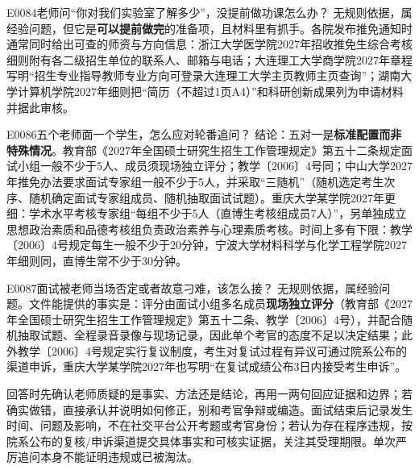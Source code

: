 \begin{qa}{E0084}{老师问“你对我们实验室了解多少”，没提前做功课怎么办？}
无规则依据，属经验问题，但它是\textbf{可以提前做完}的准备项，且材料里有抓手。各院发布推免通知时通常同时给出可查的师资与方向信息：浙江大学医学院2027年招收推免生综合考核细则附有各二级招生单位的联系人、邮箱与电话；大连理工大学商学院2027年章程写明“招生专业指导教师专业方向可登录大连理工大学主页教师主页查询”；湖南大学计算机学院2027年细则把“简历（不超过1页A4）”和科研创新成果列为申请材料并据此审核。
\end{qa}

\begin{qa}{E0086}{五个老师面一个学生，怎么应对轮番追问？}
结论：五对一是\textbf{标准配置而非特殊情况}。教育部《2027年全国硕士研究生招生工作管理规定》第五十二条规定面试小组一般不少于5人、成员须现场独立评分；教学〔2006〕4号同；中山大学2027年推免办法要求面试专家组一般不少于5人，并采取“三随机”（随机选定考生次序、随机确定面试专家组成员、随机抽取面试试题）。重庆大学某学院2027年更细：学术水平考核专家组“每组不少于5人（直博生考核组成员7人）”，另单独成立思想政治素质和品德考核组负责政治素养与心理素质考核。时间上多有下限：教学〔2006〕4号规定每生一般不少于20分钟，宁波大学材料科学与化学工程学院2027年细则同，直博生常不少于30分钟。
\end{qa}

\begin{qa}{E0087}{面试被老师当场否定或者故意刁难，该怎么接？}
无规则依据，属经验问题。文件能提供的事实是：评分由面试小组多名成员\textbf{现场独立评分}（教育部《2027年全国硕士研究生招生工作管理规定》第五十二条、教学〔2006〕4号），并配合随机抽取试题、全程录音录像与现场记录，因此单个考官的态度不足以决定结果；此外教学〔2006〕4号规定实行复议制度，考生对复试过程有异议可通过院系公布的渠道申诉，重庆大学某学院2027年也写明“在复试成绩公布3日内接受考生申诉”。

回答时先确认老师质疑的是事实、方法还是结论，再用一两句回应证据和边界；若确实做错，直接承认并说明如何修正，别和考官争辩或编造。面试结束后记录发生时间、问题及影响，不在社交平台公开考题或考官身份；若认为存在程序违规，按院系公布的复核/申诉渠道提交具体事实和可核实证据，关注其受理期限。单次严厉追问本身不能证明违规或已被淘汰。
\end{qa}

